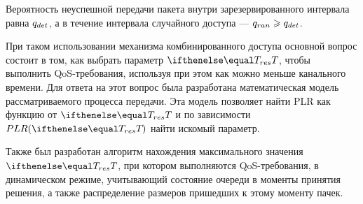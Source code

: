 Вероятность неуспешной передачи пакета внутри зарезервированного интервала равна $q_{det}$, а в течение интервала случайного доступа --- $q_{ran} \geqslant q_{det}$. 

При таком использовании механизма комбинированного доступа основной вопрос состоит в том, как выбрать параметр $\Tres$, чтобы выполнить QoS-требования, используя при этом как можно меньше канального времени. Для ответа на этот вопрос была разработана математическая модель рассматриваемого процесса передачи. Эта модель позволяет найти PLR как функцию от $\Tres$ и по зависимости $PLR(\Tres)$ найти искомый параметр.

Также был разработан алгоритм нахождения максимального значения $\Tres$, при котором выполняются QoS-требования, в динамическом режиме, учитывающий состояние очереди в моменты принятия решения, а также распределение размеров пришедших к этому моменту пачек.






